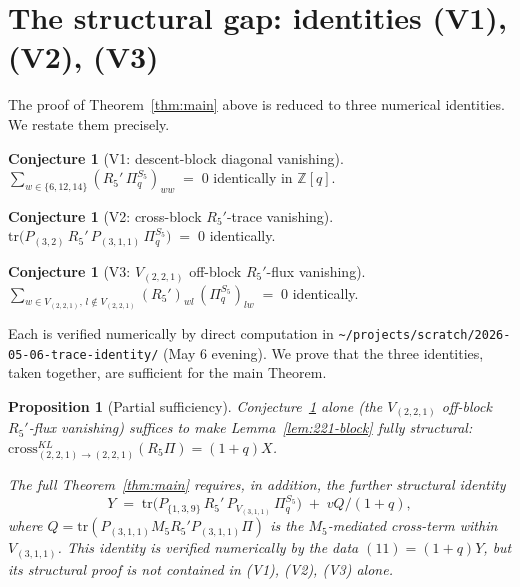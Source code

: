 \documentclass[11pt]{article}
\newtheorem{proposition}[theorem]{Proposition}
\theoremstyle{definition}
\newtheorem{conjecture}[theorem]{Conjecture}
\begin{document}
\section{The structural gap: identities (V1), (V2), (V3)}\label{sec:gap}

The proof of Theorem~\ref{thm:main} above is reduced to three numerical
identities. We restate them precisely.

\begin{conjecture}[V1: descent-block diagonal vanishing]\label{conj:V1}
$\sum_{w \in \{6, 12, 14\}} (R_5'\,\Pi_q^{S_5})_{ww} \;=\; 0$ identically in $\mathbb{Z}[q]$.
\end{conjecture}

\begin{conjecture}[V2: cross-block $R_5'$-trace vanishing]\label{conj:V2}
$\mathrm{tr}\bigl(P_{(3,2)}\,R_5'\,P_{(3,1,1)}\,\Pi_q^{S_5}\bigr) \;=\; 0$ identically.
\end{conjecture}

\begin{conjecture}[V3: $V_{(2,2,1)}$ off-block $R_5'$-flux vanishing]\label{conj:V3}
$\sum_{w \in V_{(2,2,1)},\, l \notin V_{(2,2,1)}} (R_5')_{wl}\,(\Pi_q^{S_5})_{lw} \;=\; 0$
identically.
\end{conjecture}

Each is verified numerically by direct computation in
\texttt{\textasciitilde/projects/scratch/2026-05-06-trace-identity/} (May 6 evening).
We prove that the three identities, taken together, are sufficient for the
main Theorem.

\begin{proposition}[Partial sufficiency]\label{prop:sufficient}
Conjecture~\ref{conj:V3} alone (the $V_{(2,2,1)}$ off-block $R_5'$-flux vanishing) suffices to make Lemma~\ref{lem:221-block} fully structural: $\mathrm{cross}_{(2,2,1)\to(2,2,1)}^{KL}(R_5\Pi) = (1+q) X$.

The full Theorem~\ref{thm:main} requires, in addition, the further structural identity
\begin{equation}\label{eq:Y-equality}\tag{V$_Y$}
Y \;=\; \mathrm{tr}\bigl(P_{\{1,3,9\}}\, R_5'\, P_{V_{(3,1,1)}}\, \Pi_q^{S_5}\bigr) \;+\; v Q / (1+q),
\end{equation}
where $Q = \mathrm{tr}(P_{(3,1,1)} M_5 R_5' P_{(3,1,1)} \Pi)$ is the $M_5$-mediated cross-term within $V_{(3,1,1)}$.
This identity is verified numerically by the data $(11) = (1+q) Y$, but its structural proof is not contained in (V1), (V2), (V3) alone.
\end{proposition}
\end{document}
